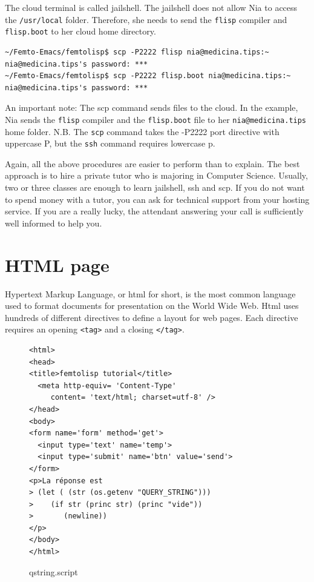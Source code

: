 \documentclass[a4paper,12pt]{book}
\begin{document}
The cloud terminal  is called
jailshell. The jailshell does not allow Nia
to access the \verb|/usr/local| folder.
Therefore, she needs to send the \verb|flisp| compiler and
\verb|flisp.boot| to her cloud home directory.
\begin{Verbatim}[fontsize=\small,
frame=single,
framerule=0.5mm]
~/Femto-Emacs/femtolisp$ scp -P2222 flisp nia@medicina.tips:~
nia@medicina.tips's password: ***
~/Femto-Emacs/femtolisp$ scp -P2222 flisp.boot nia@medicina.tips:~
nia@medicina.tips's password: ***
\end{Verbatim}
An important note: The scp command sends files to
the cloud. In the example, Nia sends the \verb|flisp|
compiler and the \verb|flisp.boot| file
to her  \verb|nia@medicina.tips| home folder.
N.B. The \verb|scp| command takes the -P2222
port directive with uppercase P,
but the \verb|ssh| command requires lowercase p.

Again, all the above procedures are easier to perform
than to explain. The best approach is to hire a private
tutor who is  majoring in Computer Science.
Usually, two or three classes are enough to
learn jailshell, ssh and scp.
If you do not want to spend money with
a tutor,  you can ask for
technical support from your hosting service. 
If you are a really lucky, the attendant
answering your call is sufficiently well
informed to help you.

\section{HTML page}
Hypertext Markup Language, or html for short, is the most
common language used to format documents
for presentation on the World Wide Web.
Html uses hundreds of different directives to define
a layout for web pages. Each directive requires an
opening \verb|<tag>| and a closing \verb|</tag>|.

\begin{figure}[!h]
\begin{verbatim}
<html>
<head>
<title>femtolisp tutorial</title>
  <meta http-equiv= 'Content-Type'
     content= 'text/html; charset=utf-8' />
</head>
<body>
<form name='form' method='get'>
  <input type='text' name='temp'>
  <input type='submit' name='btn' value='send'>
</form>
<p>La réponse est  
> (let ( (str (os.getenv "QUERY_STRING")))
>    (if str (princ str) (princ "vide"))
>       (newline))
</p>
</body>
</html>
\end{verbatim}
\caption{qstring.script}
\label{lst:qstring.script}
\end{figure}
\end{document}
